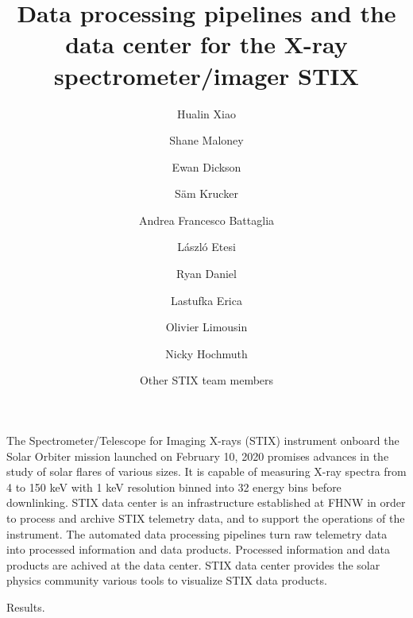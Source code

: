 \documentclass[referee]{aa} %
\begin{document}
 


   \title{Data processing pipelines and the data center for the X-ray spectrometer/imager STIX}

   \subtitle{}

   \author{Hualin Xiao
          \and 
          Shane Maloney 
          \and 
          Ewan Dickson 
          \and 
          S\"am Krucker
          \and Andrea Francesco Battaglia
            \and László Etesi 
          \and Ryan Daniel 
          \and Lastufka Erica 
          \and Olivier Limousin 
          \and Nicky Hochmuth 
          \and Other STIX team members
         }


   \date{}

 
  \abstract
   {} %
   { The Spectrometer/Telescope for Imaging X-rays (STIX) instrument onboard the Solar Orbiter mission launched on February 10, 2020 promises advances in the study of solar flares of various sizes. It is capable of measuring X-ray spectra from 4 to 150 keV with 1 keV resolution binned into 32 energy bins before downlinking. STIX data center is an infrastructure established at FHNW in order to process and archive STIX telemetry data, and to support the operations of the instrument. The automated data processing pipelines turn raw telemetry data into processed information and data products. Processed information and data products are achived at the data center.  STIX data center provides the solar physics community various tools to visualize STIX data products.
   }

   {Results.}
   {}
\end{document}

